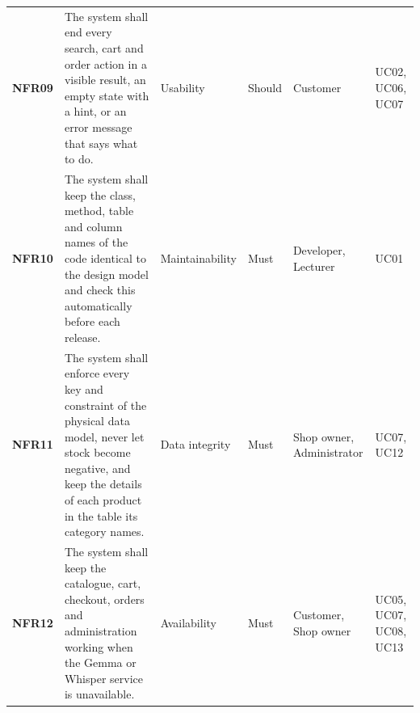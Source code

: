 \begin{longtable}{@{}P{1.2cm}P{5.5cm}P{2.4cm}P{1.35cm}P{2.3cm}P{1.75cm}@{}}
\small \textbf{NFR09} & \small The system shall end every search, cart and order action in a visible result, an empty state with a hint, or an error message that says what to do. & \small Usability & \small Should & \small Customer & \small UC02, UC06, UC07\\
\small \textbf{NFR10} & \small The system shall keep the class, method, table and column names of the code identical to the design model and check this automatically before each release. & \small Maintainability & \small Must & \small Developer, Lecturer & \small UC01\\
\small \textbf{NFR11} & \small The system shall enforce every key and constraint of the physical data model, never let stock become negative, and keep the details of each product in the table its category names. & \small Data integrity & \small Must & \small Shop owner, Administrator & \small UC07, UC12\\
\small \textbf{NFR12} & \small The system shall keep the catalogue, cart, checkout, orders and administration working when the Gemma or Whisper service is unavailable. & \small Availability & \small Must & \small Customer, Shop owner & \small UC05, UC07, UC08, UC13\\
\end{longtable}

